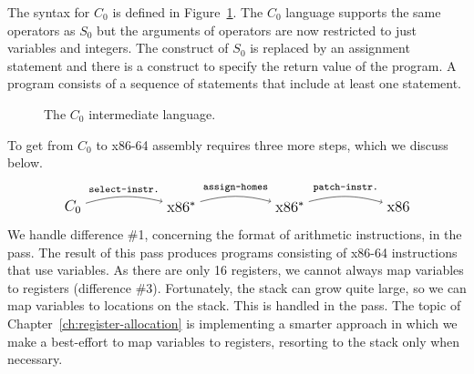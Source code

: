 \documentclass[12pt]{book}
\begin{document}
The syntax for $C_0$ is defined in Figure~\ref{fig:c0-syntax}.  The
$C_0$ language supports the same operators as $S_0$ but the arguments
of operators are now restricted to just variables and integers. The
 construct of $S_0$ is replaced by an assignment statement
and there is a  construct to specify the return value of
the program. A program consists of a sequence of statements that
include at least one  statement.

\begin{figure}[tbp]
\caption{The $C_0$ intermediate language.}
\label{fig:c0-syntax}
\end{figure}


To get from $C_0$ to x86-64 assembly requires three more steps, which
we discuss below.
\[
\begin{tikzpicture}[baseline=(current  bounding  box.center)]
\node (1) at (0,0)  {\large $C_0$};
\node (2) at (3,0)  {\large $\text{x86}^{*}$};
\node (3) at (6,0)  {\large $\text{x86}^{*}$};
\node (4) at (9,0) {\large $\text{x86}$};

\path[->,bend left=15] (1) edge [above] node {\ttfamily\footnotesize select-instr.} (2);
\path[->,bend left=15] (2) edge [above] node {\ttfamily\footnotesize assign-homes} (3);
\path[->,bend left=15] (3) edge [above] node {\ttfamily\footnotesize patch-instr.} (4);
\end{tikzpicture}
\]
We handle difference \#1, concerning the format of arithmetic
instructions, in the  pass.  The result
of this pass produces programs consisting of x86-64 instructions that
use variables.
%
As there are only 16 registers, we cannot always map variables to
registers (difference \#3). Fortunately, the stack can grow quite
large, so we can map variables to locations on the stack. This is
handled in the  pass. The topic of
Chapter~\ref{ch:register-allocation} is implementing a smarter
approach in which we make a best-effort to map variables to registers,
resorting to the stack only when necessary.
\end{document}
